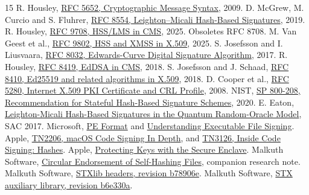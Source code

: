 \documentclass[10pt,twocolumn,letterpaper]{article}
\begin{document}
\begin{thebibliography}{15}\small
{} R. Housley, \href{https://www.rfc-editor.org/rfc/rfc5652}{RFC 5652, Cryptographic Message Syntax}, 2009.
 D. McGrew, M. Curcio and S. Fluhrer, \href{https://www.rfc-editor.org/rfc/rfc8554}{RFC 8554, Leighton--Micali Hash-Based Signatures}, 2019.
 R. Housley, \href{https://www.rfc-editor.org/rfc/rfc9708}{RFC 9708, HSS/LMS in CMS}, 2025. Obsoletes RFC 8708.
 M. Van Geest et al., \href{https://www.rfc-editor.org/rfc/rfc9802}{RFC 9802, HSS and XMSS in X.509}, 2025.
 S. Josefsson and I. Liusvaara, \href{https://www.rfc-editor.org/rfc/rfc8032}{RFC 8032, Edwards-Curve Digital Signature Algorithm}, 2017.
 R. Housley, \href{https://www.rfc-editor.org/rfc/rfc8419}{RFC 8419, EdDSA in CMS}, 2018.
 S. Josefsson and J. Schaad, \href{https://www.rfc-editor.org/rfc/rfc8410}{RFC 8410, Ed25519 and related algorithms in X.509}, 2018.
 D. Cooper et al., \href{https://www.rfc-editor.org/rfc/rfc5280}{RFC 5280, Internet X.509 PKI Certificate and CRL Profile}, 2008.
 NIST, \href{https://doi.org/10.6028/NIST.SP.800-208}{SP 800-208, Recommendation for Stateful Hash-Based Signature Schemes}, 2020.
 E. Eaton, \href{https://eprint.iacr.org/2017/607}{Leighton-Micali Hash-Based Signatures in the Quantum Random-Oracle Model}, SAC 2017.
 Microsoft, \href{https://learn.microsoft.com/en-us/windows/win32/debug/pe-format}{PE Format} and \href{https://learn.microsoft.com/en-us/windows/win32/secbp/understanding-pe-signatures}{Understanding Executable File Signing}.
 Apple, \href{https://developer.apple.com/library/archive/technotes/tn2206/}{TN2206, macOS Code Signing In Depth}, and \href{https://developer.apple.com/documentation/technotes/tn3126-inside-code-signing-hashes}{TN3126, Inside Code Signing: Hashes}.
 Apple, \href{https://developer.apple.com/documentation/security/protecting-keys-with-the-secure-enclave}{Protecting Keys with the Secure Enclave}.
 Malkuth Software, \href{https://github.com/malkuth-software/papers/blob/main/circular-file-endorsement.pdf}{Circular Endorsement of Self-Hashing Files}, companion research note.
 Malkuth Software, \href{https://github.com/malkuth-software/stxlib/tree/b78906e7f1fb23cfa21713a6c46d22af1e4e81e9/include/stxlib}{STXlib headers, revision b78906e}.
 Malkuth Software, \href{https://github.com/malkuth-software/stx_auxlib/tree/b6e330a73771253c87bf7afbe436476dbfc55cd2/include/stx_auxlib}{STX auxiliary library, revision b6e330a}.
\end{thebibliography}
\end{document}
